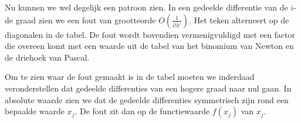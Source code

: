 \documentclass[examenvragen.tex]{subfiles}
\begin{document}
Nu kunnen we wel degelijk een patroon zien. In een gedeelde differentie van de $i$-de graad zien we een fout van grootteorde $O(\frac{1}{i!h^{i}})$. Het teken alterneert op de diagonalen in de tabel. De fout wordt bovendien vermenigvuldigd met een factor die overeen komt met een waarde uit de tabel van het binomium van Newton en de driehoek van Pascal.

Om te zien waar de fout gemaakt is in de tabel moeten we inderdaad veronderstellen dat gedeelde differenties van een hogere graad naar nul gaan. In absolute waarde zien we dat de gedeelde differenties symmetrisch zijn rond een bepaalde waarde $x_j$. De fout zit dan op de functiewaarde $f(x_{j})$ van $x_j$. 
\end{document}
